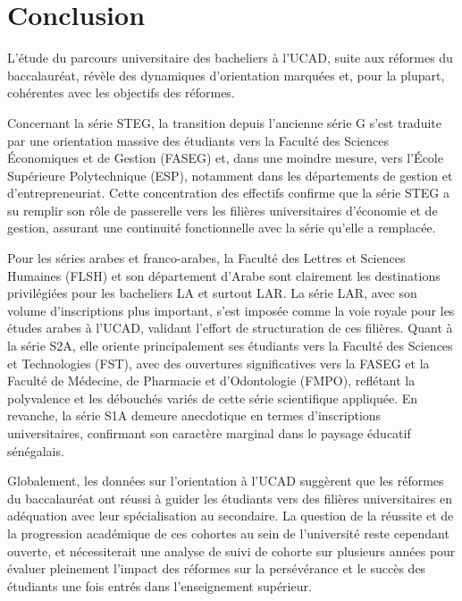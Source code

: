\section{Conclusion}

L'étude du parcours universitaire des bacheliers à l'UCAD, suite aux réformes du baccalauréat, révèle des dynamiques d'orientation marquées et, pour la plupart, cohérentes avec les objectifs des réformes.

Concernant la série STEG, la transition depuis l'ancienne série G s'est traduite par une orientation massive des étudiants vers la Faculté des Sciences Économiques et de Gestion (FASEG) et, dans une moindre mesure, vers l'École Supérieure Polytechnique (ESP), notamment dans les départements de gestion et d'entrepreneuriat. 
Cette concentration des effectifs confirme que la série STEG a su remplir son rôle de passerelle vers les filières universitaires d'économie et de gestion, assurant une continuité fonctionnelle avec la série qu'elle a remplacée.

Pour les séries arabes et franco-arabes, la Faculté des Lettres et Sciences Humaines (FLSH) et son département d'Arabe sont clairement les destinations privilégiées pour les bacheliers LA et surtout LAR. La série LAR, avec son volume d'inscriptions plus important, s'est imposée comme la voie royale pour les études arabes à l'UCAD, validant l'effort de structuration de ces filières. 
Quant à la série S2A, elle oriente principalement ses étudiants vers la Faculté des Sciences et Technologies (FST), avec des ouvertures significatives vers la FASEG et la Faculté de Médecine, de Pharmacie et d'Odontologie (FMPO), reflétant la polyvalence et les débouchés variés de cette série scientifique appliquée. 
En revanche, la série S1A demeure anecdotique en termes d'inscriptions universitaires, confirmant son caractère marginal dans le paysage éducatif sénégalais.

Globalement, les données sur l'orientation à l'UCAD suggèrent que les réformes du baccalauréat ont réussi à guider les étudiants vers des filières universitaires en adéquation avec leur spécialisation au secondaire. 
La question de la réussite et de la progression académique de ces cohortes au sein de l'université reste cependant ouverte, et nécessiterait une analyse de suivi de cohorte sur plusieurs années pour évaluer pleinement l'impact des réformes sur la persévérance et le succès des étudiants une fois entrés dans l'enseignement supérieur.